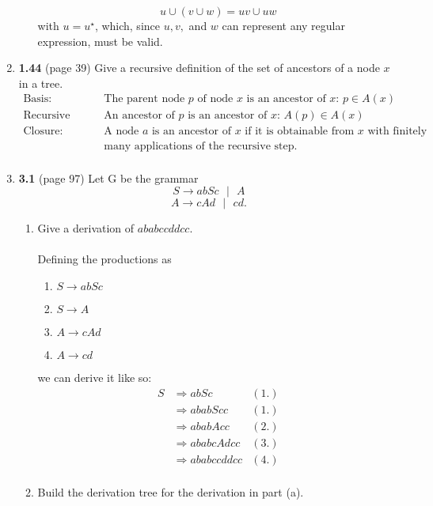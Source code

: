 \documentclass[12pt]{article}
\begin{document}
\begin{enumerate}
\begin{enumerate}
        \[ u \cup (v \cup w) = uv \cup uw \]
        with $u = u^\star$, which, since $u, v,$ and $w$ can represent any regular expression, must be valid.
      \end{enumerate}
    \item \textbf{1.44} (page 39) Give a recursive definition of the set of ancestors of a node $x$ in a tree.
      \begin{align*}
         \text{Basis: } & \text{The parent node $p$ of node $x$ is an ancestor of $x$: } p \in A(x) \\
        \text{Recursive Step: } & \text{An ancestor of $p$ is an ancestor of $x$: } A(p) \in A(x) \\
         \text{Closure: } & \text{A node $a$ is an ancestor of $x$ if it is obtainable from $x$ with finitely} \\
         & \text{many applications of the recursive step.} \\
      \end{align*}
\newpage
    \item \textbf{3.1} (page 97) Let G be the grammar 
      \[ S \rightarrow abSc \textrm{ $\vert$ } A \]
      \[ A \rightarrow cAd \textrm{ $\vert$ } cd \textrm{.}\]
      \begin{enumerate}
        \item Give a derivation of $ababccddcc$. 
          \\\\Defining the productions as
          \begin{enumerate}[1.]
            \item $S \rightarrow abSc$
            \item $S \rightarrow A$
            \item $A \rightarrow cAd$
            \item $A \rightarrow cd$
            \end{enumerate}
            we can derive it like so:
          \begin{align*}
            S &\Rightarrow abSc & (1.) \\
            &\Rightarrow ababScc & (1.) \\
            &\Rightarrow ababAcc & (2.) \\
            &\Rightarrow ababcAdcc & (3.) \\
            &\Rightarrow ababccddcc & (4.) \\
          \end{align*}
        \item Build the derivation tree for the derivation in part (a).

\end{enumerate}
\end{enumerate}
\end{document}
